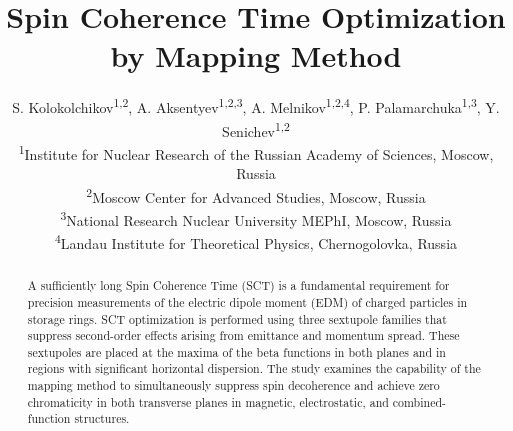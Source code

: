 \documentclass[%
               ]{jacow}
\begin{document}
\title{Spin Coherence Time Optimization by Mapping Method}

\author{S. Kolokolchikov\textsuperscript{1,2}, A. Aksentyev\textsuperscript{1,2,3}, A. Melnikov\textsuperscript{1,2,4}, P. Palamarchuka\textsuperscript{1,3}, Y. Senichev\textsuperscript{1,2} \\
\textsuperscript{1}Institute for Nuclear Research of the Russian Academy of Sciences, Moscow, Russia\\
\textsuperscript{2}Moscow Center for Advanced Studies, Moscow, Russia\\
\textsuperscript{3}National Research Nuclear University MEPhI, Moscow, Russia\\
\textsuperscript{4}Landau Institute for Theoretical Physics, Chernogolovka, Russia\\}
	
\maketitle

%
\begin{abstract}
A sufficiently long Spin Coherence Time (SCT) is a fundamental requirement for precision measurements of the electric dipole moment (EDM) of charged particles in storage rings. SCT optimization is performed using three sextupole families that suppress second-order effects arising from emittance and momentum spread. These sextupoles are placed at the maxima of the beta functions in both planes and in regions with significant horizontal dispersion. The study examines the capability of the mapping method to simultaneously suppress spin decoherence and achieve zero chromaticity in both transverse planes in magnetic, electrostatic, and combined-function structures.
\end{abstract}
\end{document}
